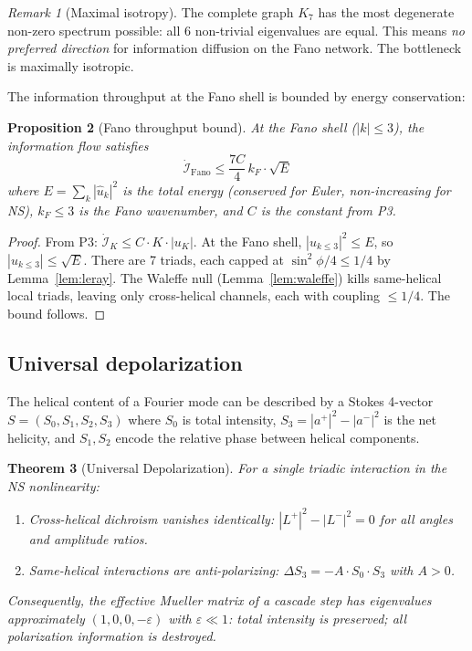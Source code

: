 \documentclass[11pt]{article}
\newtheorem{theorem}{Theorem}
\newtheorem{proposition}[theorem]{Proposition}
\theoremstyle{definition}
\theoremstyle{remark}
\newtheorem{remark}[theorem]{Remark}
\begin{document}
\begin{remark}[Maximal isotropy]
The complete graph $K_7$ has the most degenerate non-zero spectrum
possible: all 6 non-trivial eigenvalues are equal. This means
\emph{no preferred direction} for information diffusion on the Fano
network. The bottleneck is maximally isotropic.
\end{remark}

The information throughput at the Fano shell is bounded by energy
conservation:

\begin{proposition}[Fano throughput bound]\label{prop:fano-throughput}
At the Fano shell ($|k| \leq 3$), the information flow satisfies
\[
  \dot{\mathcal{I}}_{\mathrm{Fano}} \leq
  \frac{7C}{4}\, k_F \cdot \sqrt{E}
\]
where $E = \sum_k |\hat{u}_k|^2$ is the total energy (conserved for
Euler, non-increasing for NS), $k_F \leq 3$ is the Fano wavenumber,
and $C$ is the constant from \textsc{P3}.
\end{proposition}

\begin{proof}
From \textsc{P3}: $\dot{\mathcal{I}}_K \leq C \cdot K \cdot |u_K|$.
At the Fano shell, $|u_{k \leq 3}|^2 \leq E$, so $|u_{k\leq 3}| \leq \sqrt{E}$.
There are 7 triads, each capped at $\sin^2\phi/4 \leq 1/4$ by
Lemma~\ref{lem:leray}. The Waleffe null (Lemma~\ref{lem:waleffe})
kills same-helical local triads, leaving only cross-helical channels,
each with coupling $\leq 1/4$. The bound follows.
\end{proof}

\subsection{Universal depolarization}

The helical content of a Fourier mode can be described by a Stokes
4-vector $S = (S_0, S_1, S_2, S_3)$ where $S_0$ is total intensity,
$S_3 = |a^+|^2 - |a^-|^2$ is the net helicity, and $S_1, S_2$ encode
the relative phase between helical components.

\begin{theorem}[Universal Depolarization]\label{thm:depol}
For a single triadic interaction in the NS nonlinearity:
\begin{enumerate}
  \item Cross-helical dichroism vanishes identically:
    $|L^+|^2 - |L^-|^2 = 0$ for all angles and amplitude ratios.
  \item Same-helical interactions are anti-polarizing:
    $\Delta S_3 = -A \cdot S_0 \cdot S_3$ with $A > 0$.
\end{enumerate}
Consequently, the effective Mueller matrix of a cascade step has
eigenvalues approximately $(1, 0, 0, -\varepsilon)$ with
$\varepsilon \ll 1$: total intensity is preserved; all polarization
information is destroyed.
\end{theorem}
\end{document}
